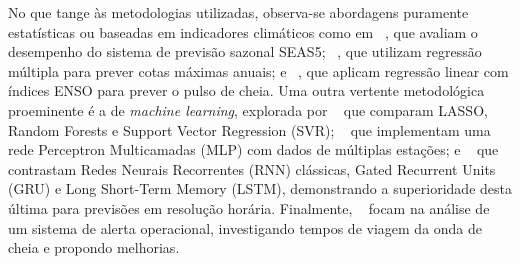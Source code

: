 \documentclass[ 12pt,a4paper ]{article} %
\begin{document}
		No que tange às metodologias utilizadas, observa-se %
		abordagens puramente estatísticas ou baseadas em indicadores climáticos como em ~\cite{Gubler2020}, que avaliam o desempenho do sistema de previsão sazonal SEAS5; ~\cite{Chevuturi2021}, que utilizam regressão múltipla para prever cotas máximas anuais; e ~\cite{SCHONGART2007}, que aplicam regressão linear com índices ENSO para prever o pulso de cheia. Uma outra vertente metodológica proeminente é a de \textit{machine learning}, explorada por ~\cite{Nguyen2015} que comparam LASSO, Random Forests e Support Vector Regression (SVR); ~\cite{Duque2022} que implementam uma rede Perceptron Multicamadas (MLP) com dados de múltiplas estações; e ~\cite{LIU2023} que contrastam Redes Neurais Recorrentes (RNN) clássicas, Gated Recurrent Units (GRU) e Long Short-Term Memory (LSTM), demonstrando a superioridade desta última para previsões em resolução horária. Finalmente, ~\cite{Maciel2022} focam na análise de um sistema de alerta operacional, investigando tempos de viagem da onda de cheia e propondo melhorias.
		
		
\end{document}
